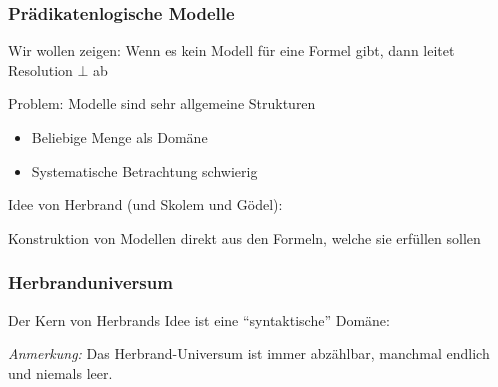 \documentclass[aspectratio=1610,onlymath]{beamer}
\begin{document}
\begin{frame}\frametitle{Prädikatenlogische Modelle}

Wir wollen zeigen: Wenn es kein Modell für eine Formel gibt, dann leitet Resolution $\bot$ ab\bigskip

\alert{Problem:} Modelle sind sehr allgemeine Strukturen
\begin{itemize}
\item Beliebige Menge als Domäne
\item Systematische Betrachtung schwierig
\end{itemize}\bigskip\pause

\alert{Idee von Herbrand (und Skolem und Gödel)}:
\begin{center}
{\Large{}}\medskip

Konstruktion von Modellen direkt aus den Formeln, welche sie erfüllen sollen
\end{center}

\end{frame}

\begin{frame}\frametitle{Herbranduniversum}

Der Kern von Herbrands Idee ist eine "`syntaktische"' Domäne:\medskip


\emph{Anmerkung:} Das Herbrand-Universum ist immer abzählbar, manchmal endlich und niemals leer.\pause


\end{frame}
\end{document}
